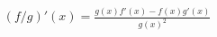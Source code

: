 \documentclass[preview]{standalone}
\begin{document}
\begin{align*}
(f/g)'(x) = \frac{g(x)f'(x)-f(x)g'(x)}{g(x)^2}
\end{align*}
\end{document}

